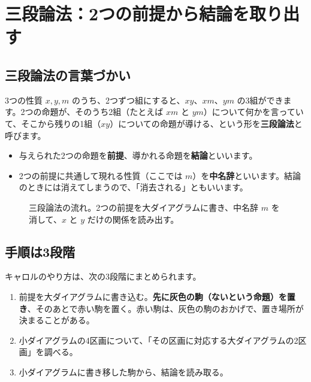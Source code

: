 \documentclass[a4paper,11pt,openany]{ltjsbook}
\begin{document}
\section{三段論法：2つの前提から結論を取り出す}

\subsection{三段論法の言葉づかい}

3つの性質 $x,y,m$ のうち、2つずつ組にすると、$xy$、$xm$、$ym$ の3組ができます。2つの命題が、そのうち2組（たとえば $xm$ と $ym$）について何かを言っていて、そこから残りの1組（$xy$）についての命題が導ける、という形を\textbf{三段論法}と呼びます。

\begin{itemize}[leftmargin=1.5em]
\item 与えられた2つの命題を\textbf{前提}、導かれる命題を\textbf{結論}といいます。
\item 2つの前提に共通して現れる性質（ここでは $m$）を\textbf{中名辞}といいます。結論のときには消えてしまうので、「消去される」ともいいます。
\end{itemize}

\begin{figure}[htbp]
\centering
{}
\caption{三段論法の流れ。2つの前提を大ダイアグラムに書き、中名辞 $m$ を消して、$x$ と $y$ だけの関係を読み出す。}
\end{figure}

\subsection{手順は3段階}

キャロルのやり方は、次の3段階にまとめられます。

\begin{enumerate}[leftmargin=2em]
\item[\textbf{(1)}] 前提を大ダイアグラムに書き込む。\textbf{先に灰色の駒（ないという命題）を置き}、そのあとで赤い駒を置く。赤い駒は、灰色の駒のおかげで、置き場所が決まることがある。
\item[\textbf{(2)}] 小ダイアグラムの4区画について、「その区画に対応する大ダイアグラムの2区画」を調べる。
\item[\textbf{(3)}] 小ダイアグラムに書き移した駒から、結論を読み取る。
\end{enumerate}
\end{document}
